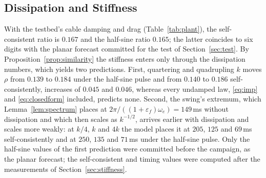 \subsection{Dissipation and Stiffness}\label{sec:dissipation}

With the testbed's cable damping and drag (Table~\ref{tab:plant}), the self-consistent ratio is $0.167$ and the half-sine ratio $0.165$; the latter coincides to six digits with the planar forecast committed for the test of Section~\ref{sec:test}. By Proposition~\ref{prop:similarity} the stiffness enters only through the dissipation numbers, which yields two predictions. First, quartering and quadrupling $k$ moves $\rho$ from $0.139$ to $0.184$ under the half-sine pulse and from $0.140$ to $0.186$ self-consistently, increases of $0.045$ and $0.046$, whereas every undamped law, \eqref{eq:imp} and \eqref{eq:closedform} included, predicts none. Second, the swing's extremum, which Lemma~\ref{lem:spectrum} places at $2\pi/((1+\varepsilon_f)\omega_e)=149$\,ms without dissipation and which then scales as $k^{-1/2}$, arrives earlier with dissipation and scales more weakly: at $k/4$, $k$ and $4k$ the model places it at $205$, $125$ and $69$\,ms self-consistently and at $250$, $135$ and $71$\,ms under the half-sine pulse. Only the half-sine values of the first prediction were committed before the campaign, as the planar forecast; the self-consistent and timing values were computed after the measurements of Section~\mbox{\ref{sec:stiffness}}.
